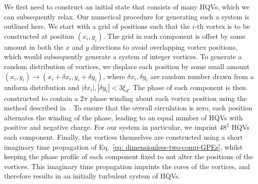 We first need to construct an initial state that consists of many HQVs, which we
can subsequently relax.
Our numerical procedure for generating such a system is outlined here.
We start with a grid of positions such that the \(i\)-th vortex is to be
constructed at position \((x_i, y_i)\).
The grid in each component is offset by some amount in both the \(x\) and \(y\)
directions to avoid overlapping vortex positions, which would subsequently
generate a system of integer vortices.
To generate a random distribution of vortices, we displace each position by some
small amount \((x_i, y_i) \rightarrow (x_i + \delta x_i, y_i + \delta y_i)\),
where \(\delta x_i, \delta y_i\) are random number drawn from a uniform
distribution and \(|\delta x_i|, |\delta y_i| < 3\xi_d\).
The phase of each component is then constructed to contain a \( 2\pi \) phase
winding about each vortex position using the method described
in~\cite{Billam2014}.
To ensure that the overall circulation is zero, each position alternates the
winding of the phase, leading to an equal number of HQVs with positive and
negative charge.
For our system in particular, we imprint \(48^2\) HQVs each component.
Finally, the vortices themselves are constructed using a short imaginary time
propagation of Eq.~\eqref{eq: dimensionless-two-comp-GPEs}, whilst keeping the
phase profile of each component fixed to not alter the positions of the
vortices.
This imaginary time propagation imprints the cores of the vortices, and
therefore results in an initially turbulent system of HQVs.

